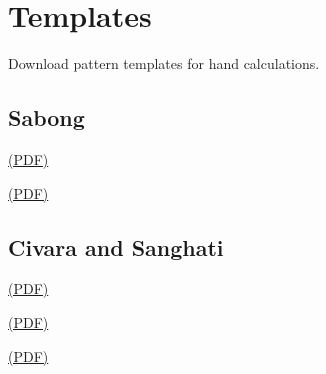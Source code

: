 \chapter{Templates}

Download pattern templates for hand calculations.

\section{Sabong}

\href{/templates/Sabong-Pattern.pdf}{(PDF)}


\href{/templates/Sabong-Pattern-Template.pdf}{(PDF)}


\section{Civara and Sanghati}

\href{/templates/Jiworn-and-Sanghati-Pattern.pdf}{(PDF)}


\href{/templates/Civara-Pattern-Template.pdf}{(PDF)}


\href{/templates/Sanghati-Pattern-Template.pdf}{(PDF)}


